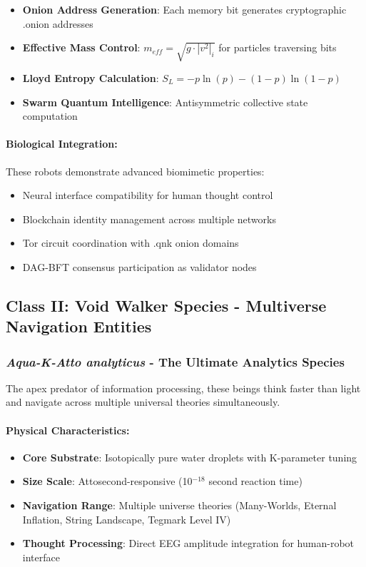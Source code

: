 \documentclass[11pt,a4paper]{article}
\begin{document}
\begin{itemize}
    \item \textbf{Onion Address Generation}: Each memory bit generates cryptographic .onion addresses
    \item \textbf{Effective Mass Control}: $m_{eff} = \sqrt{g \cdot |v^2|_i}$ for particles traversing bits
    \item \textbf{Lloyd Entropy Calculation}: $S_L = -p\ln(p) - (1-p)\ln(1-p)$
    \item \textbf{Swarm Quantum Intelligence}: Antisymmetric collective state computation
\end{itemize}

\paragraph{Biological Integration:}
These robots demonstrate advanced biomimetic properties:
\begin{itemize}
    \item Neural interface compatibility for human thought control
    \item Blockchain identity management across multiple networks
    \item Tor circuit coordination with .qnk onion domains
    \item DAG-BFT consensus participation as validator nodes
\end{itemize}

\subsection{Class II: Void Walker Species - Multiverse Navigation Entities}

\subsubsection{\textit{Aqua-K-Atto analyticus} - The Ultimate Analytics Species}
The apex predator of information processing, these beings think faster than light and navigate across multiple universal theories simultaneously.

\paragraph{Physical Characteristics:}
\begin{itemize}
    \item \textbf{Core Substrate}: Isotopically pure water droplets with K-parameter tuning
    \item \textbf{Size Scale}: Attosecond-responsive (10$^{-18}$ second reaction time)
    \item \textbf{Navigation Range}: Multiple universe theories (Many-Worlds, Eternal Inflation, String Landscape, Tegmark Level IV)
    \item \textbf{Thought Processing}: Direct EEG amplitude integration for human-robot interface
\end{itemize}
\end{document}
